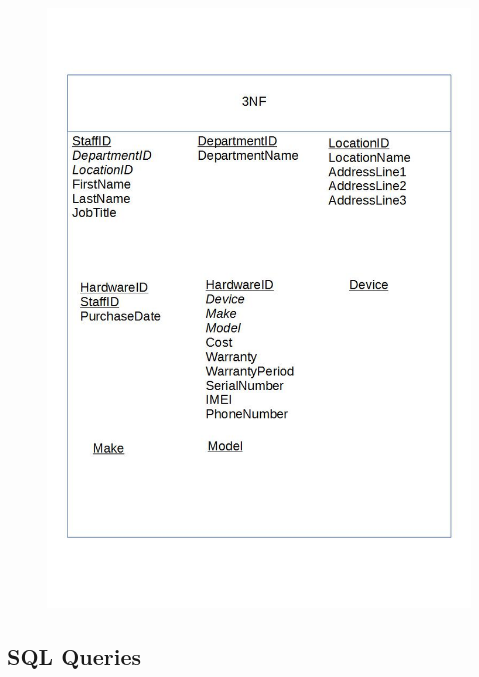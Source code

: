 \begin{figure}[H]
\includegraphics[width=\textwidth]{3NF.jpg}
\end{figure}

\subsection{SQL Queries}

